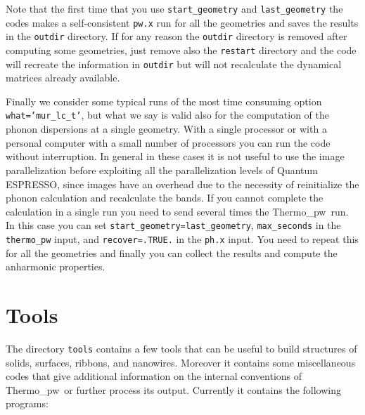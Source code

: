 \documentclass[12pt,a4paper,twoside]{report}
\def\qe{{\sc Quantum ESPRESSO}}
\def\thermo{{\sc Thermo\_pw}}
\begin{document}
Note that the first time that you use \texttt{start\_geometry} and 
\texttt{last\_geometry} the codes makes a self-consistent \texttt{pw.x} 
run for all the geometries and saves the results in the \texttt{outdir}
directory. If for any reason the \texttt{outdir} directory is removed 
after computing some geometries, just remove also the
\texttt{restart} directory and the code will recreate the information
in \texttt{outdir} but will not recalculate the dynamical matrices 
already available. 

Finally we consider some typical runs of the most time consuming option
\texttt{what='mur\_lc\_t'}, but what we say is valid also for the computation
of the phonon dispersions at a single geometry.
With a single processor or with a personal computer with a small number of 
processors you can run the code without interruption.
In general in these cases it is not useful to use the image parallelization
before exploiting all the parallelization levels of \qe, since 
images have an overhead due to the necessity of reinitialize the phonon
calculation and recalculate the bands.
If you cannot complete the calculation in a single run 
you need to send several times the \thermo\ run. 
In this case you can set \texttt{start\_geometry=last\_geometry},
\texttt{max\_seconds} in the \texttt{thermo\_pw} input,
and \texttt{recover=.TRUE.} in the \texttt{ph.x} input. You need to
repeat this for all the geometries and finally you can collect the results
and compute the anharmonic properties.


\newpage
{\color{dark-blue}\chapter{Tools}}
\color{black}

The directory \texttt{tools} contains a few tools that can be useful to build
structures of solids, surfaces, ribbons, and nanowires. Moreover it 
contains some miscellaneous codes that give additional information
on the internal conventions of \thermo\ or further process its output. 
Currently it contains the following programs:
\end{document}
